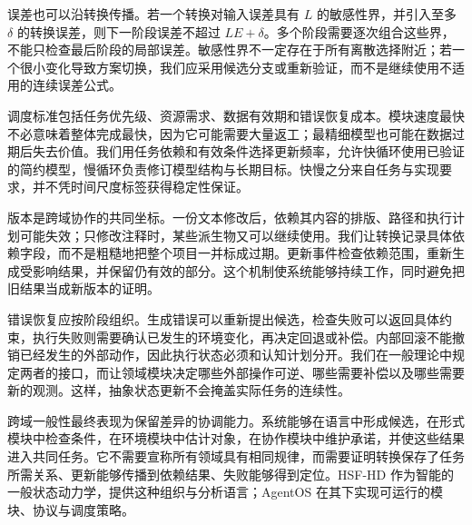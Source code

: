 误差也可以沿转换传播。若一个转换对输入误差具有 $L$ 的敏感性界，并引入至多 $\delta$ 的转换误差，则下一阶段误差不超过 $L E+\delta$。多个阶段需要逐次组合这些界，不能只检查最后阶段的局部误差。敏感性界不一定存在于所有离散选择附近；若一个很小变化导致方案切换，我们应采用候选分支或重新验证，而不是继续使用不适用的连续误差公式。

调度标准包括任务优先级、资源需求、数据有效期和错误恢复成本。模块速度最快不必意味着整体完成最快，因为它可能需要大量返工；最精细模型也可能在数据过期后失去价值。我们用任务依赖和有效条件选择更新频率，允许快循环使用已验证的简约模型，慢循环负责修订模型结构与长期目标。快慢之分来自任务与实现要求，并不凭时间尺度标签获得稳定性保证。

版本是跨域协作的共同坐标。一份文本修改后，依赖其内容的排版、路径和执行计划可能失效；只修改注释时，某些派生物又可以继续使用。我们让转换记录具体依赖字段，而不是粗糙地把整个项目一并标成过期。更新事件检查依赖范围，重新生成受影响结果，并保留仍有效的部分。这个机制使系统能够持续工作，同时避免把旧结果当成新版本的证明。

错误恢复应按阶段组织。生成错误可以重新提出候选，检查失败可以返回具体约束，执行失败则需要确认已发生的环境变化，再决定回退或补偿。内部回滚不能撤销已经发生的外部动作，因此执行状态必须和认知计划分开。我们在一般理论中规定两者的接口，而让领域模块决定哪些外部操作可逆、哪些需要补偿以及哪些需要新的观测。这样，抽象状态更新不会掩盖实际任务的连续性。

跨域一般性最终表现为保留差异的协调能力。系统能够在语言中形成候选，在形式模块中检查条件，在环境模块中估计对象，在协作模块中维护承诺，并使这些结果进入共同任务。它不需要宣称所有领域具有相同规律，而需要证明转换保存了任务所需关系、更新能够传播到依赖结果、失败能够得到定位。HSF-HD 作为智能的一般状态动力学，提供这种组织与分析语言；AgentOS 在其下实现可运行的模块、协议与调度策略。
